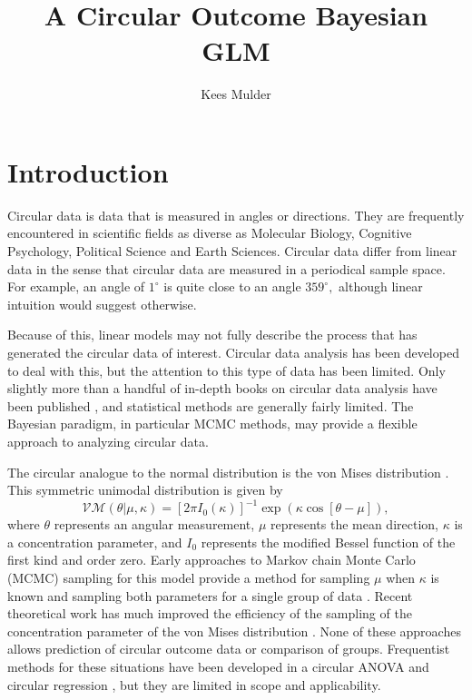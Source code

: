 \documentclass[12pt,a4paper]{article}\usepackage[]{graphicx}\usepackage[]{color}
\author{Kees Mulder}
\title{A Circular Outcome Bayesian GLM}
\begin{document}
\maketitle




\section{Introduction}

Circular data is data that is measured in angles or directions. They are frequently encountered in scientific fields as diverse as Molecular Biology, Cognitive Psychology, Political Science \citep{gill2010} and Earth Sciences. Circular data differ from linear data in the sense that circular data are measured in a periodical sample space. For example, an angle of $1^{\circ}$ is quite close to an angle $359^{\circ},$ although linear intuition would suggest otherwise.

Because of this, linear models may not fully describe the process that has generated the circular data of interest. Circular data analysis has been developed to deal with this, but the attention to this type of data has been limited. Only slightly more than a handful of in-depth books on circular data analysis have been published \citep{fisher1995statistical,mardia1999directional,pewsey2013circular}, and statistical methods are generally fairly limited. The Bayesian paradigm, in particular MCMC methods, may provide a flexible approach to analyzing circular data.

The circular analogue to the normal distribution is the von Mises distribution \citep{von1918ganzzahligkeit}. This symmetric unimodal distribution is given by
\begin{equation}
\mathcal{VM}(\theta \vert \mu, \kappa) = \left[ 2 \pi I_0(\kappa) \right]^{-1}
\exp \left( \kappa \cos \left[ \theta - \mu \right] \right),
\end{equation}
where $\theta$ represents an angular measurement, $\mu$ represents the mean direction, $\kappa$ is a concentration parameter, and $I_0$ represents the modified Bessel function of the first kind and order zero. Early approaches to Markov chain Monte Carlo (MCMC) sampling for this model provide a method for sampling $\mu$ when $\kappa$ is known \citep{mardia1976bayesian} and sampling both parameters for a single group of data \citep{damien1999fullbayes}. Recent theoretical work has much improved the efficiency of the sampling of the concentration parameter of the von Mises distribution \citep{forbes2014fast}. None of these approaches allows prediction of circular outcome data or comparison of groups. Frequentist methods for these situations have been developed in a circular ANOVA \citep{harrison1986analysis,harrison1988development} and circular regression \citep{fisher1992regression}, but they are limited in scope and applicability.
\end{document}
